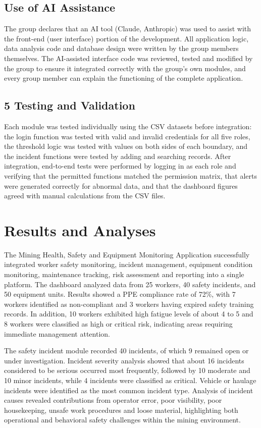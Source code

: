 \documentclass[
]{article}
\begin{document}
\subsection{Use of AI Assistance}
The group declares that an AI tool (Claude, Anthropic) was used to assist with the front-end (user interface) portion of the development. All application logic, data analysis code and database design were written by the group members themselves. The AI-assisted interface code was reviewed, tested and modified by the group to ensure it integrated correctly with the group's own modules, and every group member can explain the functioning of the complete application.

\subsection{5 Testing and Validation}
Each module was tested individually using the CSV datasets before integration: the login function was tested with valid and invalid credentials for all five roles, the threshold logic was tested with values on both sides of each boundary, and the incident functions were tested by adding and searching records. After integration, end-to-end tests were performed by logging in as each role and verifying that the permitted functions matched the permission matrix, that alerts were generated correctly for abnormal data, and that the dashboard figures agreed with manual calculations from the CSV files.


\section{Results and Analyses}

The Mining Health, Safety and Equipment Monitoring Application
successfully integrated worker safety monitoring, incident management,
equipment condition monitoring, maintenance tracking, risk assessment
and reporting into a single platform. The dashboard analyzed data from
25 workers, 40 safety incidents, and 50 equipment units. Results showed
a PPE compliance rate of 72\%, with 7 workers identified as
non-compliant and 3 workers having expired safety training records.
In addition, 10 workers exhibited high fatigue levels of about 4 to 5
and 8 workers were classified as high or critical risk, indicating
areas requiring immediate management attention.

The safety incident module recorded 40 incidents, of which 9 remained
open or under investigation. Incident severity analysis showed that
about 16 incidents considered to be serious occurred most frequently,
followed by 10 moderate and 10 minor incidents, while 4 incidents were
classified as critical. Vehicle or haulage incidents were identified
as the most common incident type. Analysis of incident causes revealed
contributions from operator error, poor visibility, poor housekeeping,
unsafe work procedures and loose material, highlighting both
operational and behavioral safety challenges within the mining
environment.
\end{document}
